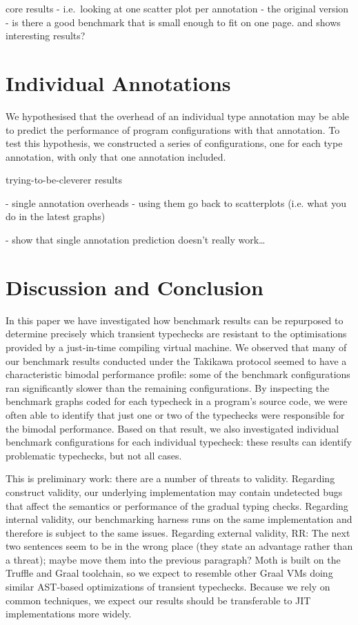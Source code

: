 \documentclass[sigplan,10pt,review,screen]{acmart}\settopmatter{printfolios=true}
\newcommand{\RR}[1]{{\color{red}RR: #1}}
\begin{document}
core results - i.e.\ looking at one scatter plot per annotation - the original version
   - is there a good benchmark that is small enough to fit on one
   page. and shows interesting results?





\section{Individual Annotations}
\label{s-individual}

We hypothesised that the overhead of an individual type annotation may
be able to predict the performance of program configurations with that
annotation. To test this hypothesis, we constructed a series of
configurations, one for each type annotation, with only that
one annotation included.



   trying-to-be-cleverer results

   - single annotation overheads
  - using them go back to scatterplots (i.e. what you do in the latest graphs) 

  - show that single annotation prediction doesn't really work\ldots

\section{Discussion and Conclusion}
\label{s-concl}

In this paper we have investigated how benchmark results can be
repurposed to determine precisely which transient typechecks are
resistant to the optimisations provided by a just-in-time compiling
virtual machine.  We observed that many of our benchmark results
conducted under the Takikawa protocol 
seemed to have a characteristic bimodal performance profile: some
of the benchmark configurations ran significantly slower than
the remaining configurations. By inspecting the benchmark graphs coded
for each typecheck in a program's source code, we were often able to
identify that just one or two of the typechecks were responsible for
the bimodal performance.  Based on that result, we also investigated
individual benchmark configurations for each individual typecheck:
these results can identify problematic typechecks, but not all cases. 

This is preliminary work: there are a number of threats to validity. 
Regarding construct validity, 
our underlying
implementation may contain undetected bugs that affect the semantics
or performance of the gradual typing checks. Regarding internal
validity,
our benchmarking harness runs on the same implementation
and therefore is subject to the same issues.
Regarding external validity, 
\RR{The next two sentences seem to be in the wrong place (they state an advantage rather than a threat); maybe move them into the previous paragraph?}
Moth is built
on the Truffle and Graal toolchain, so we expect
to resemble other Graal
VMs doing similar AST-based optimizations of transient typechecks.
Because we rely on common techniques, 
we expect our results should be transferable to JIT implementations
more widely.
\end{document}
